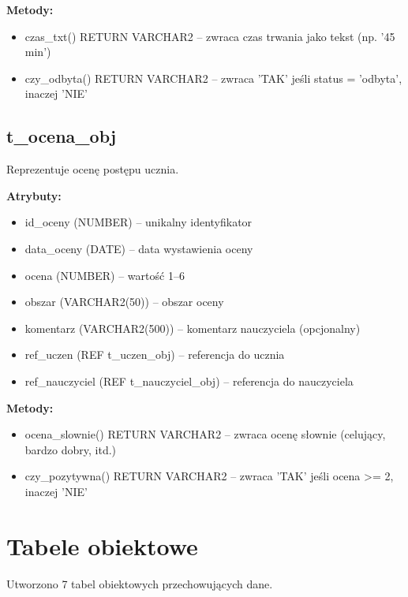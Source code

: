 \documentclass[12pt,a4paper]{article}
\begin{document}
\textbf{Metody:}
\begin{itemize}[nosep]
    \item czas\_txt() RETURN VARCHAR2 -- zwraca czas trwania jako tekst (np. '45 min')
    \item czy\_odbyta() RETURN VARCHAR2 -- zwraca 'TAK' jeśli status = 'odbyta', inaczej 'NIE'
\end{itemize}

\subsection{t\_ocena\_obj}

Reprezentuje ocenę postępu ucznia.

\textbf{Atrybuty:}
\begin{itemize}[nosep]
    \item id\_oceny (NUMBER) -- unikalny identyfikator
    \item data\_oceny (DATE) -- data wystawienia oceny
    \item ocena (NUMBER) -- wartość 1--6
    \item obszar (VARCHAR2(50)) -- obszar oceny
    \item komentarz (VARCHAR2(500)) -- komentarz nauczyciela (opcjonalny)
    \item ref\_uczen (REF t\_uczen\_obj) -- referencja do ucznia
    \item ref\_nauczyciel (REF t\_nauczyciel\_obj) -- referencja do nauczyciela
\end{itemize}

\textbf{Metody:}
\begin{itemize}[nosep]
    \item ocena\_slownie() RETURN VARCHAR2 -- zwraca ocenę słownie (celujący, bardzo dobry, itd.)
    \item czy\_pozytywna() RETURN VARCHAR2 -- zwraca 'TAK' jeśli ocena >= 2, inaczej 'NIE'
\end{itemize}

\section{Tabele obiektowe}

Utworzono 7 tabel obiektowych przechowujących dane.
\end{document}
